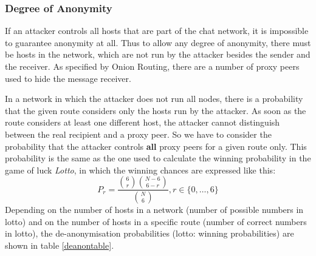 \subsubsection{Degree of Anonymity}
\label{degreeofanonymity}
If an attacker controls all hosts that are part of the chat network, 
it is impossible to guarantee anonymity at all.
Thus to allow any degree of anonymity, there must be hosts in the network,
which are not run by the attacker besides the sender and the receiver.
As specified by Onion Routing, there are a number of proxy peers used
to hide the message receiver.

In a network in which the attacker does not run all nodes, there is a probability
that the given route considers only the hosts run by the attacker. As soon as the
route considers at least one different host, the attacker cannot distinguish
between the real recipient and a proxy peer. So we have to consider the probability
that the attacker controls \textbf{all} proxy peers for a given route only.
This probability is the same as the one used to calculate the winning probability
in the game of luck \textit{Lotto}, in which the
winning chances are expressed like this:
$$P_r = \frac{{\binom{6}{r}}{\binom{N-6}{6-r}}}{{\binom{N}{6}}}, r \in \{0, \ldots, 6\}$$
Depending on the number of hosts in a network (number of possible
numbers in lotto) and on the number of hosts in a specific route
(number of correct numbers in lotto), the de-anonymisation
probabilities (lotto: winning probabilities) are shown in table \ref{deanontable}.
